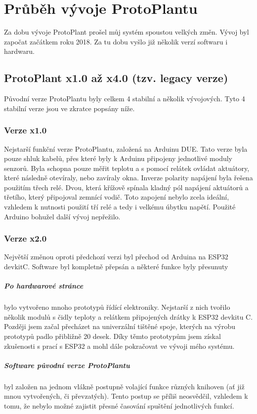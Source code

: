 \chapter{Průběh vývoje ProtoPlantu}
Za dobu vývoje ProtoPlant prošel můj systém spoustou velkých změn.
Vývoj byl započat začátkem roku 2018.
Za tu dobu vyšlo již několik verzí softwaru i hardwaru.

\section{ProtoPlant x1.0 až x4.0 (tzv. legacy verze)}
Původní verze ProtoPlantu byly celkem 4 stabilní a několik vývojových.
Tyto 4 stabilní verze jsou ve zkratce popsány níže.

\subsection{Verze x1.0}
Nejstarší funkční verze ProtoPlantu, založená na Arduinu DUE. 
Tato verze byla pouze shluk kabelů, přes které byly k Arduinu připojeny jednotlivé moduly senzorů.
Byla schopna pouze měřit teplotu a s pomocí relátek ovládat aktuátory, které následně otevíraly, nebo zavíraly okna.
Inverze polarity napájení byla řešena použitím třech relé.
Dvou, která křížově spínala kladný pól napájení aktuátorů a třetího, který připojoval zemnící vodič.
Toto zapojení nebylo zcela ideální, vzhledem k nutnosti použití tří relé a tedy i velkému úbytku napětí.
Použité Arduino bohužel další vývoj nepřežilo.

\subsection{Verze x2.0}
Největší změnou oproti předchozí verzi byl přechod od Arduina na ESP32 devkitC.
Software byl kompletně přepsán a některé funkce byly přesunuty

\paragraph{Po hardwarové stránce}
bylo vytvořeno mnoho prototypů řídící elektroniky.
Nejstarší z nich tvořilo několik modulů s čidly teploty a relátkem připojených drátky k ESP32 devkitu C.
Později jsem začal přecházet na univerzální tištěné spoje, kterých na výrobu prototypů padlo přibližně 20 desek.
Díky těmto prototypům jsem získal zkušenosti s prací s ESP32 a mohl dále pokračovat ve vývoji mého systému.

\paragraph{Software původní verze ProtoPlantu}
byl založen na jednom vlákně postupně volající funkce různých knihoven (ať již mnou vytvořených, či převzatých).
Tento postup se příliš neosvědčil, vzhledem k tomu, že nebylo možné zajistit přesné časování spuštění jednotlivých funkcí.

\section{}


\newpage